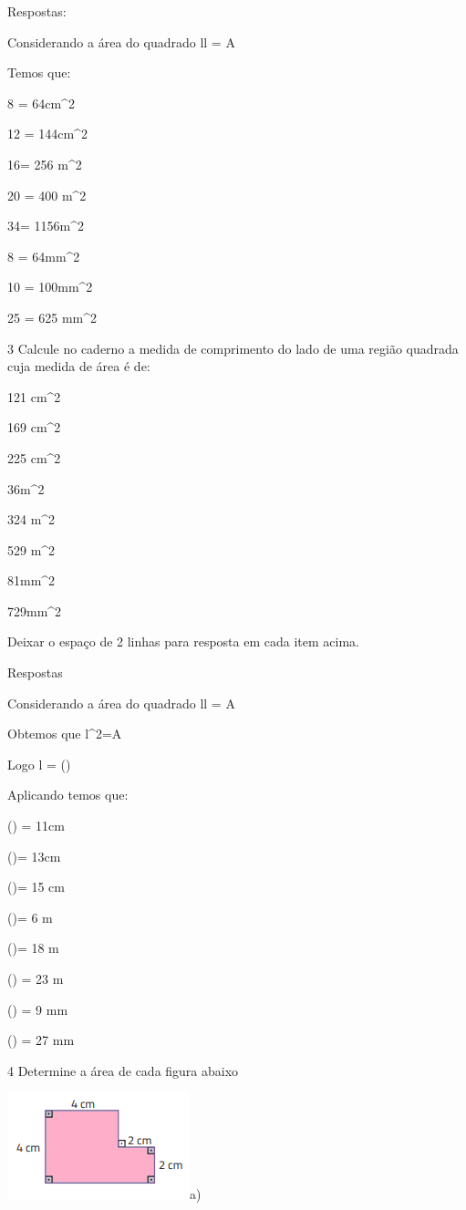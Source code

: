 Respostas:

Considerando a área do quadrado l\times l = A

Temos que:

\item 8 = 64cm^2
\item 12 = 144cm^2
\item 16= 256 m^2
\item 20 = 400 m^2
\item 34= 1156m^2
\item 8 = 64mm^2
\item 10 = 100mm^2
\item 25 = 625 mm^2

\num{3} Calcule no caderno a medida de comprimento do lado de uma região
quadrada cuja medida de área é de:

\item 121 cm^2
\item 169 cm^2
\item 225 cm^2
\item 36m^2
\item 324 m^2
\item 529 m^2
\item 81mm^2
\item 729mm^2

Deixar o espaço de 2 linhas para resposta em cada item acima.

Respostas

Considerando a área do quadrado l\times l = A

Obtemos que l^2=A

Logo l = ()

Aplicando temos que:

\item () = 11cm
\item ()= 13cm
\item ()= 15 cm
\item ()= 6 m
\item ()= 18 m
\item () = 23 m
\item () = 9 mm
\item () = 27 mm

\num{4} Determine a área de cada figura abaixo

\includegraphics[width=1\times 65in,height=0\times 96458in]{./imgSAEB_8_MAT/media/image43.png}a)

